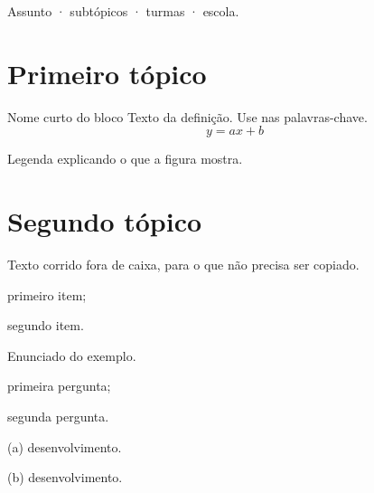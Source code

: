 \documentclass{notaaula}        %
\begin{document}
\cabecalho

\begin{sobre}
Assunto · subtópicos · turmas · escola.
\end{sobre}

\section{Primeiro tópico}

\begin{copiar}{Nome curto do bloco}
 Texto da definição. Use  nas palavras-chave.
\[ y = a x + b \]
\end{copiar}


\begin{figuranota}{Legenda explicando o que a figura mostra.}
\end{figuranota}

\section{Segundo tópico}

Texto corrido fora de caixa, para o que não precisa ser copiado.
\begin{itens}
\item primeiro item;
\item segundo item.
\end{itens}

\begin{exemplo}
Enunciado do exemplo.
\begin{alternativas}
\item primeira pergunta;
\item segunda pergunta.
\end{alternativas}
\resolucao (a) desenvolvimento. 

(b) desenvolvimento.
\end{exemplo}
\end{document}
